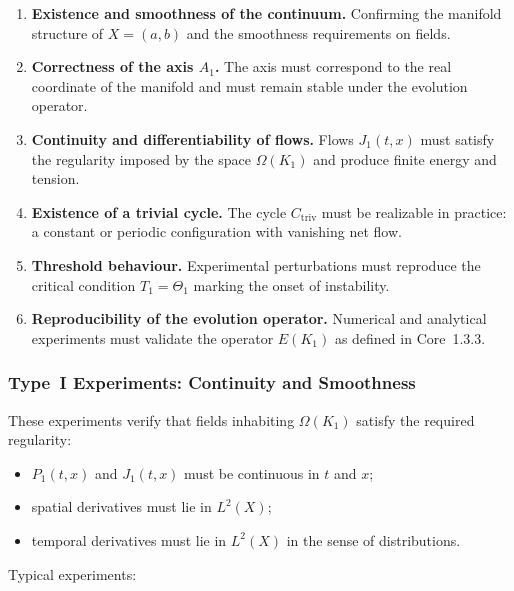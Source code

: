 \begin{enumerate}
    \item \textbf{Existence and smoothness of the continuum.}
          Confirming the manifold structure of $X=(a,b)$
          and the smoothness requirements on fields.

    \item \textbf{Correctness of the axis $A_1$.}
          The axis must correspond to the real coordinate of the
          manifold and must remain stable under the evolution operator.

    \item \textbf{Continuity and differentiability of flows.}
          Flows $J_1(t,x)$ must satisfy the regularity imposed by the
          space $\Omega(K_1)$ and produce finite energy and tension.

    \item \textbf{Existence of a trivial cycle.}
          The cycle $C_{\mathrm{triv}}$ must be realizable in practice:
          a constant or periodic configuration with vanishing net flow.

    \item \textbf{Threshold behaviour.}
          Experimental perturbations must reproduce the critical
          condition $T_1 = \Theta_1$ marking the onset of instability.

    \item \textbf{Reproducibility of the evolution operator.}
          Numerical and analytical experiments must validate the
          operator $E(K_1)$ as defined in Core~1.3.3.
\end{enumerate}


\subsubsection{Type~I Experiments: Continuity and Smoothness}

These experiments verify that fields inhabiting $\Omega(K_1)$ satisfy the
required regularity:

\begin{itemize}
    \item $P_1(t,x)$ and $J_1(t,x)$ must be continuous in $t$ and $x$;
    \item spatial derivatives must lie in $L^2(X)$;
    \item temporal derivatives must lie in $L^2(X)$ in the sense of
          distributions.
\end{itemize}

Typical experiments:

